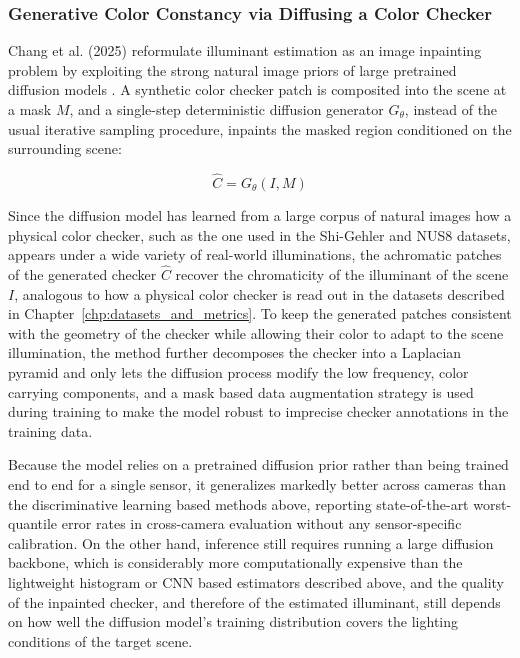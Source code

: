 \subsubsection{Generative Color Constancy via Diffusing a Color Checker}

Chang et al. (2025) reformulate illuminant estimation as an image inpainting problem by exploiting the strong natural image priors of large pretrained diffusion models \cite{chang2025generativeColorConstancy}. A synthetic color checker patch is composited into the scene at a mask $M$, and a single-step deterministic diffusion generator $G_\theta$, instead of the usual iterative sampling procedure, inpaints the masked region conditioned on the surrounding scene:

\begin{equation}
\hat{C} = G_{\theta}(I, M)
\end{equation}

Since the diffusion model has learned from a large corpus of natural images how a physical color checker, such as the one used in the Shi-Gehler and NUS8 datasets, appears under a wide variety of real-world illuminations, the achromatic patches of the generated checker $\hat{C}$ recover the chromaticity of the illuminant of the scene $I$, analogous to how a physical color checker is read out in the datasets described in Chapter~\ref{chp:datasets_and_metrics}. To keep the generated patches consistent with the geometry of the checker while allowing their color to adapt to the scene illumination, the method further decomposes the checker into a Laplacian pyramid and only lets the diffusion process modify the low frequency, color carrying components, and a mask based data augmentation strategy is used during training to make the model robust to imprecise checker annotations in the training data.

Because the model relies on a pretrained diffusion prior rather than being trained end to end for a single sensor, it generalizes markedly better across cameras than the discriminative learning based methods above, reporting state-of-the-art worst-quantile error rates in cross-camera evaluation without any sensor-specific calibration. On the other hand, inference still requires running a large diffusion backbone, which is considerably more computationally expensive than the lightweight histogram or CNN based estimators described above, and the quality of the inpainted checker, and therefore of the estimated illuminant, still depends on how well the diffusion model's training distribution covers the lighting conditions of the target scene.

